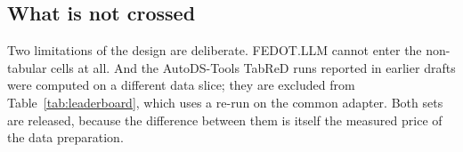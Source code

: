 \subsection{What is not crossed}

Two limitations of the design are deliberate. FEDOT.LLM cannot enter the
non-tabular cells at all. And the AutoDS-Tools TabReD runs reported in earlier
drafts were computed on a different data slice; they are excluded from
Table~\ref{tab:leaderboard}, which uses a re-run on the common adapter. Both
sets are released, because the difference between them is itself the measured
price of the data preparation.
